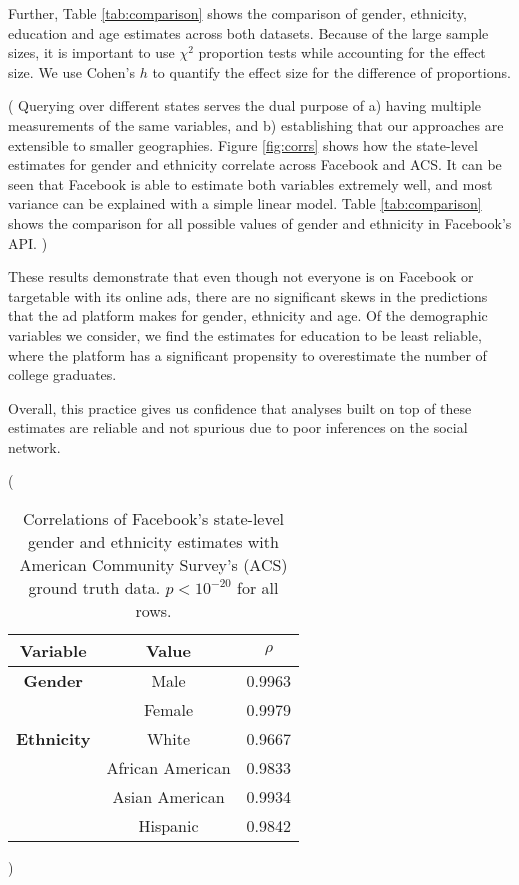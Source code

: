 Further, Table \ref{tab:comparison} shows the comparison of gender, ethnicity, education and age estimates across both datasets. Because of the large sample sizes, it is important to use $\chi^2$ proportion tests while accounting for the effect size. We use Cohen's $h$ to quantify the effect size for the difference of proportions.

\if(
Querying over different states serves the dual purpose of a) having multiple measurements of the same variables, and b) establishing that our approaches are extensible to smaller geographies. Figure \ref{fig:corrs} shows how the state-level estimates for gender and ethnicity correlate across Facebook and ACS. It can be seen that Facebook is able to estimate both variables extremely well, and most variance can be explained with a simple linear model. Table \ref{tab:comparison} shows the comparison for all possible values of gender and ethnicity in Facebook's API.
)\fi

These results demonstrate that even though not everyone is on Facebook or targetable with its online ads, there are no significant skews in the predictions that the ad platform makes for gender, ethnicity and age. Of the demographic variables we consider, we find the estimates for education to be least reliable, where the platform has a significant propensity to overestimate the number of college graduates.

Overall, this practice gives us confidence that analyses built on top of these estimates are reliable and not spurious due to poor inferences on the social network.

\if(
\begin{table}
\centering
\begin{tabular}{c | c | c } 
\toprule
\textbf{Variable} & \textbf{Value} & \textbf{$\rho$}\\
 \hline
\textbf{Gender} & Male & 0.9963\\
& Female & 0.9979\\
 \hline
 \textbf{Ethnicity} & White & 0.9667\\
 & African American & 0.9833\\
 & Asian American & 0.9934\\
 & Hispanic & 0.9842\\
\end{tabular}
\caption{Correlations of Facebook's state-level gender and ethnicity estimates with American Community Survey's (ACS) ground truth data. $p < 10^{-20}$ for all rows.}
\label{tab:corrs}
\end{table}
)\fi

